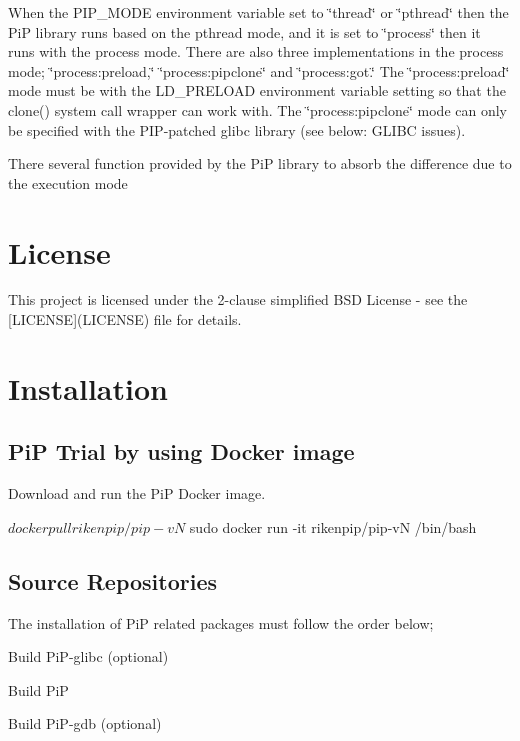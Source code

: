 When the {\ttfamily P\-I\-P\-\_\-\-M\-O\-D\-E} environment variable set to \char`\"{}thread\char`\"{} or \char`\"{}pthread\char`\"{} then the Pi\-P library runs based on the pthread mode, and it is set to \char`\"{}process\char`\"{} then it runs with the process mode. There are also three implementations in the process mode; \char`\"{}process\-:preload,\char`\"{} \char`\"{}process\-:pipclone\char`\"{} and \char`\"{}process\-:got.\char`\"{} The \char`\"{}process\-:preload\char`\"{} mode must be with the L\-D\-\_\-\-P\-R\-E\-L\-O\-A\-D environment variable setting so that the clone() system call wrapper can work with. The \char`\"{}process\-:pipclone\char`\"{} mode can only be specified with the P\-I\-P-\/patched glibc library (see below\-: G\-L\-I\-B\-C issues).

There several function provided by the Pi\-P library to absorb the difference due to the execution mode

\section*{License}

This project is licensed under the 2-\/clause simplified B\-S\-D License -\/ see the \mbox{[}L\-I\-C\-E\-N\-S\-E\mbox{]}(L\-I\-C\-E\-N\-S\-E) file for details.

\section*{Installation}

\subsection*{Pi\-P Trial by using Docker image}

Download and run the Pi\-P Docker image. \begin{DoxyVerb}$ docker pull rikenpip/pip-vN
$ sudo docker run -it rikenpip/pip-vN /bin/bash
\end{DoxyVerb}


\subsection*{Source Repositories}

The installation of Pi\-P related packages must follow the order below;


\begin{DoxyEnumerate}
\item Build Pi\-P-\/glibc (optional)
\item Build Pi\-P
\item Build Pi\-P-\/gdb (optional)
\end{DoxyEnumerate}

